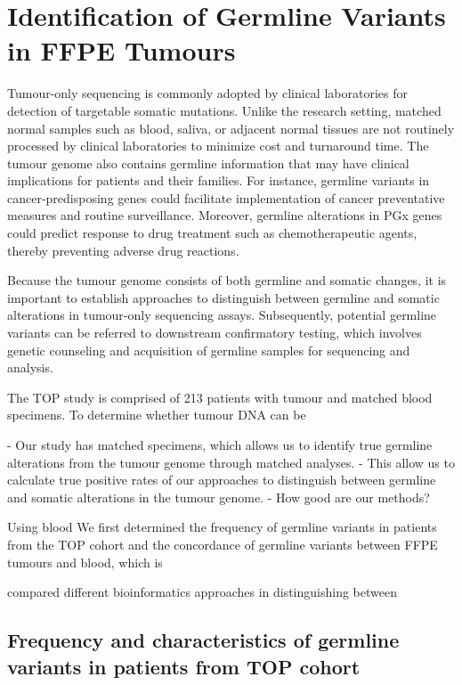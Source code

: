
\chapter{Identification of Germline Variants in FFPE Tumours}
\label{ch:IdentificationofGermlineVariantsinFFPETumours}

Tumour-only sequencing is commonly adopted by clinical laboratories for detection of targetable somatic mutations. Unlike the research setting, matched normal samples such as blood, saliva, or adjacent normal tissues are not routinely processed by clinical laboratories to minimize cost and turnaround time. The tumour genome also contains germline information that may have clinical implications for patients and their families. For instance, germline variants in cancer-predisposing genes could facilitate implementation of cancer preventative measures and routine surveillance. Moreover, germline alterations in PGx genes could predict response to drug treatment such as chemotherapeutic agents, thereby preventing adverse drug reactions.

Because the tumour genome consists of both germline and somatic changes, it is important to establish approaches to distinguish between germline and somatic alterations in tumour-only sequencing assays. Subsequently, potential germline variants can be referred to downstream confirmatory testing, which involves genetic counseling and acquisition of germline samples for sequencing and analysis.

The TOP study is comprised of 213 patients with tumour and matched blood specimens. To determine whether tumour DNA can be

- Our study has matched specimens, which allows us to identify true germline alterations from the tumour genome through matched analyses.
- This allow us to calculate true positive rates of our approaches to distinguish between germline and somatic alterations in the tumour genome.
-  How good are our methods?

Using blood We first determined the frequency of germline variants in patients from the TOP cohort and the concordance of germline variants between FFPE tumours and blood, which is

compared different bioinformatics approaches in distinguishing between

\section{Frequency and characteristics of germline variants in patients from TOP cohort}
\label{sec:FrequencyandcharacteristicsofgermlinevariantsinpatientsfromTOPcohort}

